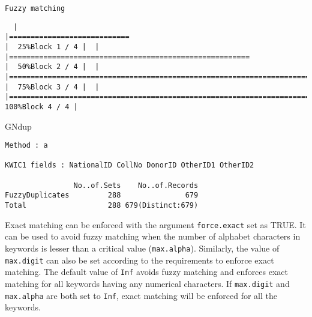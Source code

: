 \documentclass[
]{article}
\newenvironment{Shaded}{\begin{snugshade}}{\end{snugshade}}
\newcommand{\NormalTok}[1]{#1}
\begin{document}
\begin{verbatim}
Fuzzy matching
\end{verbatim}

\begin{verbatim}
  |                                                                                                                       |============================                                                                                   |  25%Block 1 / 4 |  |                                                                                                                       |========================================================                                                       |  50%Block 2 / 4 |  |                                                                                                                       |===================================================================================                            |  75%Block 3 / 4 |  |                                                                                                                       |===============================================================================================================| 100%Block 4 / 4 |
\end{verbatim}

\begin{Shaded}
\begin{Highlighting}[]
\NormalTok{GNdup}
\end{Highlighting}
\end{Shaded}

\begin{verbatim}
Method : a

KWIC1 fields : NationalID CollNo DonorID OtherID1 OtherID2
 
                No..of.Sets    No..of.Records
FuzzyDuplicates         288               679
Total                   288 679(Distinct:679)
\end{verbatim}

Exact matching can be enforced with the argument \texttt{force.exact}
set as TRUE. It can be used to avoid fuzzy matching when the number of
alphabet characters in keywords is lesser than a critical value
(\texttt{max.alpha}). Similarly, the value of \texttt{max.digit} can
also be set according to the requirements to enforce exact matching. The
default value of \texttt{Inf} avoids fuzzy matching and enforces exact
matching for all keywords having any numerical characters. If
\texttt{max.digit} and \texttt{max.alpha} are both set to \texttt{Inf},
exact matching will be enforced for all the keywords.
\end{document}
